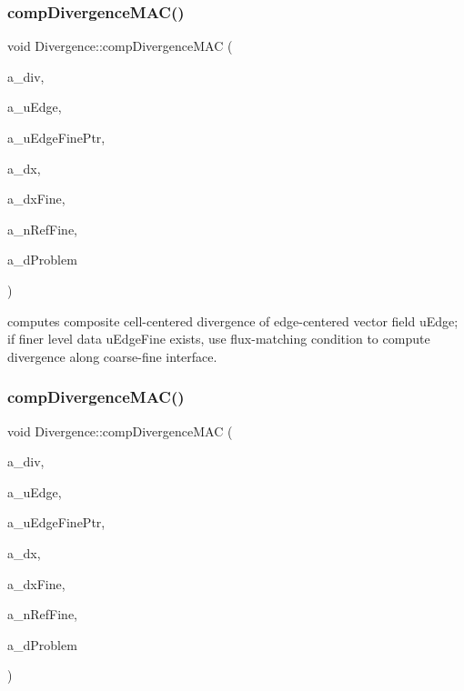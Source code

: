 \subsubsection{\texorpdfstring{comp\+Divergence\+M\+A\+C()}{compDivergenceMAC()}\hspace{0.1cm}{\footnotesize\ttfamily [1/4]}}
{\footnotesize\ttfamily void Divergence\+::comp\+Divergence\+M\+AC (\begin{DoxyParamCaption}\item[{\textbf{ Level\+Data}$<$ \textbf{ F\+Array\+Box} $>$ \&}]{a\+\_\+div,  }\item[{\textbf{ Level\+Data}$<$ \textbf{ Flux\+Box} $>$ \&}]{a\+\_\+u\+Edge,  }\item[{\textbf{ Level\+Data}$<$ \textbf{ Flux\+Box} $>$ $\ast$}]{a\+\_\+u\+Edge\+Fine\+Ptr,  }\item[{const \textbf{ Real}}]{a\+\_\+dx,  }\item[{const \textbf{ Real} $\ast$}]{a\+\_\+dx\+Fine,  }\item[{const int}]{a\+\_\+n\+Ref\+Fine,  }\item[{const \textbf{ Problem\+Domain} \&}]{a\+\_\+d\+Problem }\end{DoxyParamCaption})\hspace{0.3cm}{\ttfamily [static]}}

computes composite cell-\/centered divergence of edge-\/centered vector field u\+Edge; if finer level data u\+Edge\+Fine exists, use flux-\/matching condition to compute divergence along coarse-\/fine interface. \mbox{\label{class_divergence_ab223946c8b00bee70b0f73530ef274fe}} 
\subsubsection{\texorpdfstring{comp\+Divergence\+M\+A\+C()}{compDivergenceMAC()}\hspace{0.1cm}{\footnotesize\ttfamily [2/4]}}
{\footnotesize\ttfamily void Divergence\+::comp\+Divergence\+M\+AC (\begin{DoxyParamCaption}\item[{\textbf{ Level\+Data}$<$ \textbf{ F\+Array\+Box} $>$ \&}]{a\+\_\+div,  }\item[{\textbf{ Level\+Data}$<$ \textbf{ Flux\+Box} $>$ \&}]{a\+\_\+u\+Edge,  }\item[{\textbf{ Level\+Data}$<$ \textbf{ Flux\+Box} $>$ $\ast$}]{a\+\_\+u\+Edge\+Fine\+Ptr,  }\item[{const \textbf{ Real}}]{a\+\_\+dx,  }\item[{const \textbf{ Real} $\ast$}]{a\+\_\+dx\+Fine,  }\item[{const int}]{a\+\_\+n\+Ref\+Fine,  }\item[{const \textbf{ Box} \&}]{a\+\_\+d\+Problem }\end{DoxyParamCaption})\hspace{0.3cm}{\ttfamily [static]}}


